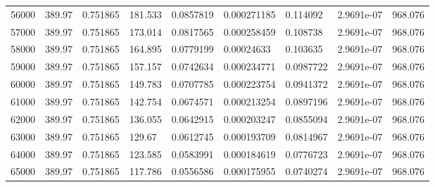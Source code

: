 \begin{tabular}{lllllllll}
56000 & 389.97 & 0.751865 & 181.533 & 0.0857819 & 0.000271185 & 0.114092 & 2.9691e-07 & 968.076 \\
57000 & 389.97 & 0.751865 & 173.014 & 0.0817565 & 0.000258459 & 0.108738 & 2.9691e-07 & 968.076 \\
58000 & 389.97 & 0.751865 & 164.895 & 0.0779199 & 0.00024633 & 0.103635 & 2.9691e-07 & 968.076 \\
59000 & 389.97 & 0.751865 & 157.157 & 0.0742634 & 0.000234771 & 0.0987722 & 2.9691e-07 & 968.076 \\
60000 & 389.97 & 0.751865 & 149.783 & 0.0707785 & 0.000223754 & 0.0941372 & 2.9691e-07 & 968.076 \\
61000 & 389.97 & 0.751865 & 142.754 & 0.0674571 & 0.000213254 & 0.0897196 & 2.9691e-07 & 968.076 \\
62000 & 389.97 & 0.751865 & 136.055 & 0.0642915 & 0.000203247 & 0.0855094 & 2.9691e-07 & 968.076 \\
63000 & 389.97 & 0.751865 & 129.67 & 0.0612745 & 0.000193709 & 0.0814967 & 2.9691e-07 & 968.076 \\
64000 & 389.97 & 0.751865 & 123.585 & 0.0583991 & 0.000184619 & 0.0776723 & 2.9691e-07 & 968.076 \\
65000 & 389.97 & 0.751865 & 117.786 & 0.0556586 & 0.000175955 & 0.0740274 & 2.9691e-07 & 968.076 \\
\hline
\end{tabular}